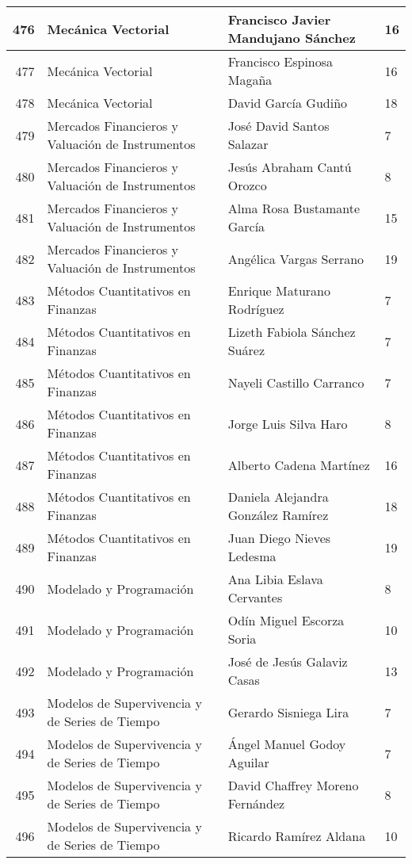 \begin{table}[ht]
\begin{tabular}{rlll}
  476 & Mecánica Vectorial & Francisco Javier Mandujano Sánchez & 16 \\ \hline
  477 & Mecánica Vectorial & Francisco Espinosa Magaña & 16 \\ \hline
  478 & Mecánica Vectorial & David García Gudiño & 18 \\ \hline
  479 & Mercados Financieros y Valuación de Instrumentos & José David Santos Salazar & 7 \\ \hline
  480 & Mercados Financieros y Valuación de Instrumentos & Jesús Abraham Cantú Orozco & 8 \\ \hline
  481 & Mercados Financieros y Valuación de Instrumentos & Alma Rosa Bustamante García & 15 \\ \hline
  482 & Mercados Financieros y Valuación de Instrumentos & Angélica Vargas Serrano & 19 \\ \hline
  483 & Métodos Cuantitativos en Finanzas & Enrique Maturano Rodríguez & 7 \\ \hline
  484 & Métodos Cuantitativos en Finanzas & Lizeth Fabiola Sánchez Suárez & 7 \\ \hline
  485 & Métodos Cuantitativos en Finanzas & Nayeli Castillo Carranco & 7 \\ \hline
  486 & Métodos Cuantitativos en Finanzas & Jorge Luis Silva Haro & 8 \\ \hline
  487 & Métodos Cuantitativos en Finanzas & Alberto Cadena Martínez & 16 \\ \hline
  488 & Métodos Cuantitativos en Finanzas & Daniela Alejandra González Ramírez & 18 \\ \hline
  489 & Métodos Cuantitativos en Finanzas & Juan Diego Nieves Ledesma & 19 \\ \hline
  490 & Modelado y Programación & Ana Libia Eslava Cervantes & 8 \\ \hline
  491 & Modelado y Programación & Odín Miguel Escorza Soria & 10 \\ \hline
  492 & Modelado y Programación & José de Jesús Galaviz Casas & 13 \\ \hline
  493 & Modelos de Supervivencia y de Series de Tiempo & Gerardo Sisniega Lira & 7 \\ \hline
  494 & Modelos de Supervivencia y de Series de Tiempo & Ángel Manuel Godoy Aguilar & 7 \\ \hline
  495 & Modelos de Supervivencia y de Series de Tiempo & David Chaffrey Moreno Fernández & 8 \\ \hline
  496 & Modelos de Supervivencia y de Series de Tiempo & Ricardo Ramírez Aldana & 10 \\ \hline

\end{tabular}
\end{table}
